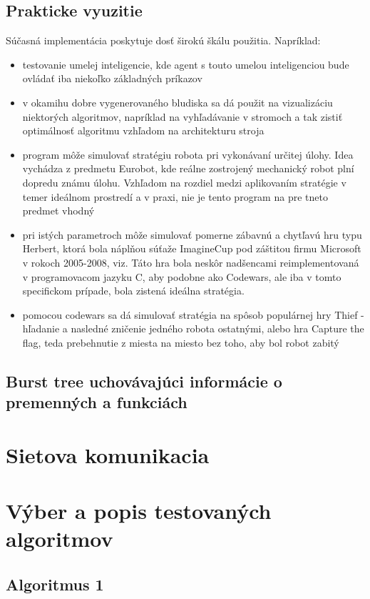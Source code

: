 \documentclass[12pt,a4paper,notitlepage]{report}
\begin{document}
\section{Prakticke vyuzitie}
Súčasná implementácia poskytuje dosť širokú škálu použitia. Napríklad:\\
	\begin{itemize}
	\item testovanie umelej inteligencie, kde agent s touto umelou inteligenciou bude ovládať iba niekoľko základných príkazov
	\item v okamihu dobre vygenerovaného bludiska sa dá použit na vizualizáciu niektorých algoritmov, napríklad na vyhľadávanie v stromoch a tak zistiť optimálnosť algoritmu vzhľadom na architekturu stroja
	\item program môže simulovať stratégiu robota pri vykonávaní určitej úlohy. Idea vychádza z predmetu Eurobot, kde reálne zostrojený mechanický robot plní dopredu známu úlohu. Vzhľadom na rozdiel medzi aplikovaním stratégie v temer ideálnom prostredí a v praxi, nie je tento program na pre tneto predmet vhodný
	\item pri istých parametroch môže simulovať pomerne zábavnú a chytľavú hru typu Herbert, ktorá bola náplňou súťaže ImagineCup pod záštitou firmu Microsoft v rokoch 2005-2008, viz\cite{imaginecup}. Táto hra bola neskôr nadšencami reimplementovaná v programovacom jazyku C, aby podobne ako Codewars, ale iba v tomto specifickom prípade, bola zistená ideálna stratégia. %
	\item pomocou codewars sa dá simulovať stratégia na spôsob populárnej hry Thief - hľadanie a nasledné zničenie jedného robota ostatnými, alebo hra Capture the flag, teda prebehnutie z miesta na miesto bez toho, aby bol robot zabitý
	\end{itemize}


\section {Burst tree uchovávajúci informácie o premenných a funkciách} 
\chapter{Sietova komunikacia}
\chapter{Výber a popis testovaných algoritmov}
\section{Algoritmus 1}
\end{document}
